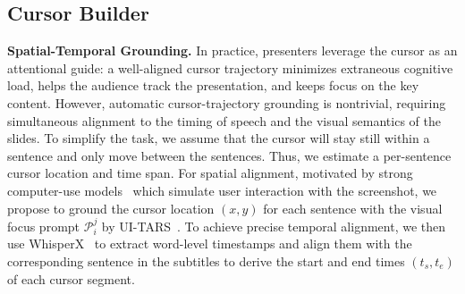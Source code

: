 \subsection{Cursor Builder}
\vspace{-0.5\baselineskip} 
\label{sec:cursor}
\textbf{Spatial-Temporal Grounding.}
In practice, presenters leverage the cursor as an attentional guide: a well-aligned cursor trajectory minimizes extraneous cognitive load, helps the audience track the presentation, and keeps focus on the key content. However, automatic cursor-trajectory grounding is nontrivial, requiring simultaneous alignment to the timing of speech and the visual semantics of the slides. To simplify the task, we assume that the cursor will stay still within a sentence and only move between the sentences. Thus, we estimate a per-sentence cursor location and time span. For spatial alignment, motivated by strong computer-use models~\cite{lin2025showui,qin2025ui} which simulate user interaction with the screenshot, we propose to ground the cursor location $(x,y)$ for each sentence with the visual focus prompt $\mathcal{P}_{i}^{j}$ by UI-TARS~\cite{qin2025ui}. To achieve precise temporal alignment, we then use WhisperX~\cite{bain2023whisperx} to extract word-level timestamps and align them with the corresponding sentence in the subtitles to derive the start and end times $(t_s,t_e)$ of each cursor segment.
